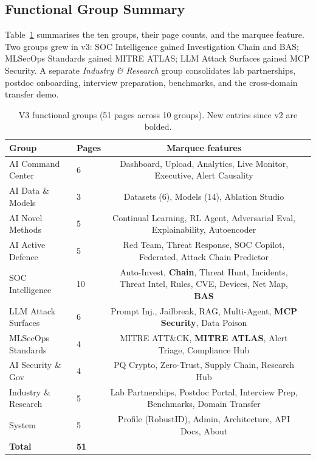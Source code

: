 \documentclass[11pt,a4paper]{article}
\begin{document}
\subsection{Functional Group Summary}
Table~\ref{tab:groups-v3} summarises the ten groups, their page counts,
and the marquee feature.  Two groups grew in v3: SOC Intelligence
gained Investigation Chain and BAS; MLSecOps Standards gained MITRE
ATLAS; LLM Attack Surfaces gained MCP Security.  A separate
\emph{Industry \& Research} group consolidates lab partnerships,
postdoc onboarding, interview preparation, benchmarks, and the
cross-domain transfer demo.

\begin{table}[H]
\centering
\caption{V3 functional groups (51 pages across 10 groups). New
  entries since v2 are bolded.}
\label{tab:groups-v3}
\small
\begin{tabular}{@{}llcl@{}}
\toprule
\textbf{Group} & \textbf{Pages} & \textbf{Marquee features} \\
\midrule
AI Command Center     & 6 & Dashboard, Upload, Analytics, Live Monitor, Executive, Alert Causality \\
AI Data \& Models     & 3 & Datasets (6), Models (14), Ablation Studio \\
AI Novel Methods      & 5 & Continual Learning, RL Agent, Adversarial Eval, Explainability, Autoencoder \\
AI Active Defence     & 5 & Red Team, Threat Response, SOC Copilot, Federated, Attack Chain Predictor \\
SOC Intelligence      & 10 & Auto-Invest, \textbf{Chain}, Threat Hunt, Incidents, Threat Intel, Rules, CVE, Devices, Net Map, \textbf{BAS} \\
LLM Attack Surfaces   & 6 & Prompt Inj., Jailbreak, RAG, Multi-Agent, \textbf{MCP Security}, Data Poison \\
MLSecOps Standards    & 4 & MITRE ATT\&CK, \textbf{MITRE ATLAS}, Alert Triage, Compliance Hub \\
AI Security \& Gov    & 4 & PQ Crypto, Zero-Trust, Supply Chain, Research Hub \\
Industry \& Research  & 5 & Lab Partnerships, Postdoc Portal, Interview Prep, Benchmarks, Domain Transfer \\
System                & 5 & Profile (RobustID), Admin, Architecture, API Docs, About \\
\midrule
\textbf{Total}        & \textbf{51} & \\
\bottomrule
\end{tabular}
\end{table}
\end{document}
